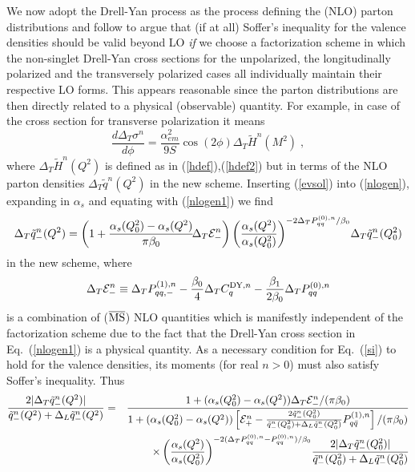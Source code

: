 We now adopt the Drell-Yan process as the process defining the (NLO) parton 
distributions and follow \cite{cont2} to argue that (if at all) Soffer's 
inequality for the valence densities should be valid beyond LO {\em if} 
we choose a factorization scheme in which the non-singlet Drell-Yan 
cross sections for the unpolarized, the longitudinally polarized and 
the transversely polarized cases all individually maintain their respective 
LO forms. This appears reasonable since the parton distributions are then 
directly related to a physical (observable) quantity. For example, in case 
of the cross section for transverse polarization it means 
\begin{equation} \label{nlogen1}
\frac{d\Delta_T \sigma^n}{d\phi} = \frac{\alpha_{em}^2}{9S} \cos (2 \phi)
\Delta_T \tilde{H}^n (M^2) \; ,
\end{equation}
where $\Delta_T \tilde{H}^n (Q^2)$ is defined as in (\ref{hdef}),(\ref{hdef2}) 
but in terms of the NLO parton densities $\Delta_T \tilde{q}^n (Q^2)$ 
in the new scheme. Inserting (\ref{evsol}) into (\ref{nlogen}), expanding in 
$\alpha_s$ and equating with (\ref{nlogen1}) we find 
\begin{equation} \label{evsol1}
\Delta_T \tilde{q}_{-}^n (Q^2) = \left( 1+\frac{\alpha_s (Q_0^2)-
\alpha_s (Q^2)}{\pi\beta_0}\! \Delta_T {\cal E}_{-}^n  \right)
\left( \frac{\alpha_s (Q^2)}{\alpha_s (Q_0^2)}\right)^{-2\Delta_T 
P_{qq}^{(0),n}/ \beta_0}\! \Delta_T \tilde{q}_{-}^n (Q_0^2) 
\end{equation}
in the new scheme, where 
\begin{equation} \label{edef}
\Delta_T {\cal E}_{-}^n \equiv \Delta_T P_{qq,-}^{(1),n}-\frac{\beta_0}{4}
\Delta_T C_q^{{\small {\rm DY}},n} - \frac{\beta_1}{2\beta_0} 
\Delta_T P_{qq}^{(0),n} 
\end{equation}
is a combination of ($\overline{{\mbox{\rm MS}}}$) NLO quantities which is 
manifestly independent of the factorization scheme due to the fact that the 
Drell-Yan cross section in Eq.~(\ref{nlogen1}) is a physical quantity.
As a necessary condition for Eq.~(\ref{si}) to hold for the valence densities, 
its moments (for real $n>0$) must also satisfy Soffer's inequality. Thus
\begin{eqnarray} \label{nloeq}
\nonumber
\frac{2 |\Delta_T \tilde{q}_{-}^n (Q^2)|}{\tilde{q}_{-}^n (Q^2) +
\Delta_L \tilde{q}_{-}^n (Q^2)} &=& \frac{1+( \alpha_s (Q_0^2)-
\alpha_s (Q^2)) \Delta_T {\cal E}_{-}^n/(\pi\beta_0)}
{1+( \alpha_s (Q_0^2)-\alpha_s (Q^2)) \left[ {\cal E}_{+}^n -
\frac{2 \tilde{q}_{-}^n (Q_0^2)}{\tilde{q}_{-}^n (Q_0^2) +
\Delta_L \tilde{q}_{-}^n (Q_0^2)} P_{q\bar{q}}^{(1),n} \right] 
/(\pi\beta_0)} \\ 
&&\times 
\left( \frac{\alpha_s (Q^2)}{\alpha_s (Q_0^2)}\right)^{-2 (\Delta_T 
P_{qq}^{(0),n}-P_{qq}^{(0),n}) / \beta_0}\! 
\frac{2 |\Delta_T \tilde{q}_{-}^n (Q_0^2)|}{\tilde{q}_{-}^n (Q_0^2) +
\Delta_L \tilde{q}_{-}^n (Q_0^2)}
\end{eqnarray}

